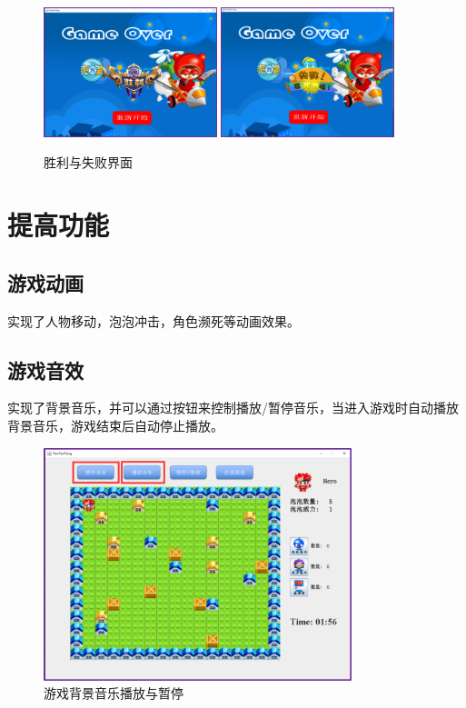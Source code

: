 \documentclass[UTF8, a4paper]{ctexart}
\begin{document}
   \begin{figure}[h]
    \centering
        {\includegraphics[width=0.45\textwidth]{victory.png}}
    \hspace{0.05\textwidth}
        {\includegraphics[width=0.45\textwidth]{failure.png}}
    \caption{胜利与失败界面}
    \label{fig:gameSetup}
  \end{figure}
\section{提高功能}
\subsection{游戏动画}
实现了人物移动，泡泡冲击，角色濒死等动画效果。
\subsection{游戏音效}
实现了背景音乐，并可以通过按钮来控制播放/暂停音乐，当进入游戏时自动播放背景音乐，游戏结束后自动停止播放。
 \begin{figure}[H] %
    \centering
    \includegraphics[width=0.80\textwidth]{playmusic.png}
    \caption{游戏背景音乐播放与暂停}
    \label{fig:music}
  \end{figure}
\end{document}
